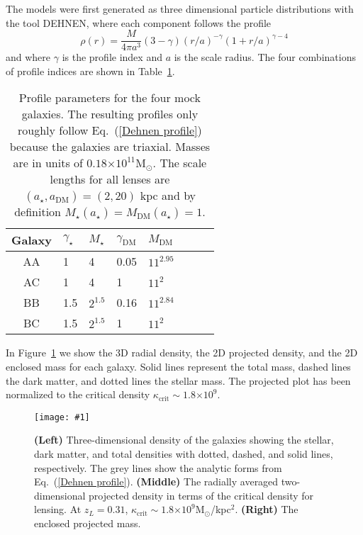 \documentclass[onecolumn,galley]{mn2e}
\newcommand{\Msun}{\ensuremath{\mathrm{M}_\odot}}
\newcommand{\tabref}[1] {Table~\ref{#1}}
\newcommand{\figref}[1] {Figure~\ref{#1}}
\newcommand{\eqnref}[1] {Eq.~(\ref{#1})}
\newcommand{\e}[1]{\ensuremath{\times 10^{#1}}}
\newcommand\plotone[1]{%
 \centering
 \leavevmode
 \texttt{[image: \#1]}%
}%
\begin{document}
The models were
first generated as three dimensional particle distributions with the
tool DEHNEN, where each component follows the profile
\begin{equation}
\rho(r) = \frac{M}{4\pi a^3}(3-\gamma){(r/a)^{-\gamma}(1 + r/a)^{\gamma-4}}
\label{Dehnen profile}
\end{equation}
and where $\gamma$ is the profile index and $a$ is the scale radius. The
four combinations of profile indices are shown in \tabref{Lens profile params}.

\begin{table}
\begin{tabular}{clllllll}
Galaxy & $\gamma_\star$ & $M_\star$ & $\gamma_\mathrm{DM}$ & $M_\mathrm{DM}$ \\
\hline
AA & 1 & 4 & 0.05 & $11^{2.95}$ \\
AC & 1 & 4 & 1 & $11^2$ \\
BB & 1.5 & $2^{1.5}$ & 0.16 & $11^{2.84}$ \\
BC & 1.5 & $2^{1.5}$ & 1 & $11^2$
\end{tabular}
\caption{Profile parameters for the four mock galaxies. The resulting profiles only roughly follow
\eqnref{Dehnen profile} because the galaxies are triaxial. Masses are in units of $0.18\e{11}\Msun$. The scale lengths for
all lenses are $(a_\star,a_\mathrm{DM})=(2,20)$ kpc and by definition
$M_\star(a_\star) = M_\mathrm{DM}(a_\star) = 1$.}
\label{Lens profile params}
\end{table}

In \figref{mock galaxies} we show the 3D radial density, 
the 2D projected density, and the 2D enclosed mass for each
galaxy. Solid lines represent the total mass, dashed lines the dark 
matter, and dotted lines the stellar mass. The projected plot has
been normalized to the critical density 
$\kappa_\mathrm{crit}\sim 1.8\e{9}$.

\begin{figure}
\plotone{cmp_simulations.pdf}
\caption{
\textbf{(Left)} 
Three-dimensional density of the galaxies showing the stellar, dark matter,
and total densities with dotted, dashed, and solid lines, respectively. The
grey lines show the analytic forms from \eqnref{Dehnen profile}. 
\textbf{(Middle)} 
The radially averaged two-dimensional projected density in terms of the
critical density for lensing. At $z_L=0.31$, $\kappa_\mathrm{crit}\sim 1.8\e{9}$\Msun/kpc$^2$.
\textbf{(Right)}
The enclosed projected mass.
}
\label{mock galaxies}
\end{figure}
\end{document}
